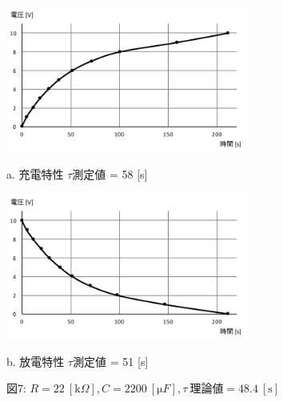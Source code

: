 \documentclass[uplatex]{jsarticle}
\begin{document}
			\begin{figure}[h]
				\begin{minipage}{0.5\hsize}
					\begin{center}
						\includegraphics[width = 8cm]{7-a.pdf}
					\end{center}
					\captionsetup{labelformat=empty,labelsep=none}
					\caption{a. 充電特性 $\tau$測定値 = 58 [s]}
				\end{minipage}
				\begin{minipage}{0.5\hsize}
					\begin{center}
						\includegraphics[width = 8cm]{7-b.pdf}
					\end{center}
					\captionsetup{labelformat=empty,labelsep=none}
					\caption{b. 放電特性 $\tau$測定値 = 51 [s]}
				\end{minipage}
				\captionsetup{labelformat=empty,labelsep=none}
				\caption{図7: $R = 22 \ [\mathrm k \Omega], C = 2200 \ [\mathrm \mu F], \tau \ 理論値 = 48.4 \ [\mathrm s]$}
			\end{figure}
\end{document}
